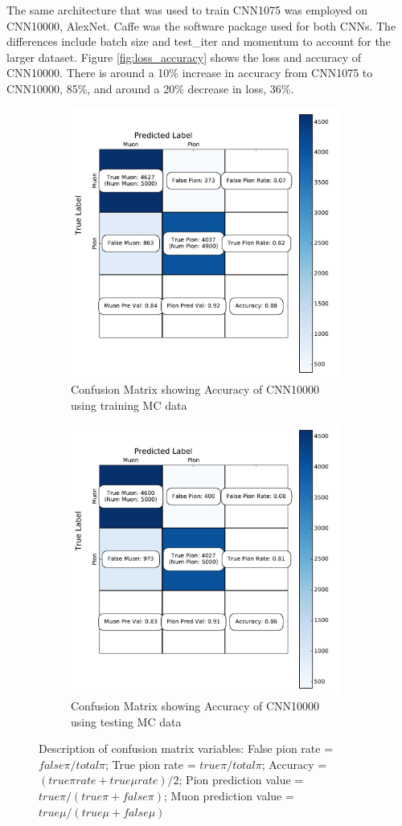 The same architecture that was used to train CNN1075 was employed on CNN10000, AlexNet. Caffe \cite{caffe} was the software package used for both CNNs. The differences include batch size and test{\_}iter and momentum to account for the larger dataset. Figure \ref{fig:loss_accuracy} shows the loss and accuracy of CNN10000. There is around a 10\% increase in accuracy from CNN1075 to CNN10000, 85\%, and around a 20\% decrease in loss, 36\%.

\begin{figure}[htp!]
\centering
	\begin{subfigure}[b]{.7\textwidth}
	\includegraphics[width=\textwidth,height=3.5in]{figs/train_confusion.pdf}
	\caption{Confusion Matrix showing Accuracy of CNN10000 using training MC data}
	\label{fig:confusion}
	\end{subfigure}
	\quad
	\begin{subfigure}[b]{.7\textwidth}
	\includegraphics[width=\textwidth,height=3.5in]{figs/val_confusion.pdf}
	\caption{Confusion Matrix showing Accuracy of CNN10000 using testing MC data}
	\label{fig:confusion_test}
	\end{subfigure}
	\quad
\caption{Description of confusion matrix variables: False pion rate = $false \pi/ total \pi$; True pion rate = $true \pi/total \pi$; Accuracy = $(true \pi rate + true \mu rate)/2$; Pion prediction value = $true \pi/(true \pi + false \pi)$; Muon prediction value = $true \mu/(true \mu + false \mu)$}
\label{fig:CNN_train}
\end{figure}

